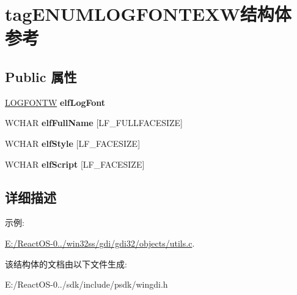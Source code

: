 \hypertarget{structtag_e_n_u_m_l_o_g_f_o_n_t_e_x_w}{}\section{tag\+E\+N\+U\+M\+L\+O\+G\+F\+O\+N\+T\+E\+X\+W结构体 参考}
\label{structtag_e_n_u_m_l_o_g_f_o_n_t_e_x_w}
\subsection*{Public 属性}
\begin{DoxyCompactItemize}
\item 
\mbox{\label{structtag_e_n_u_m_l_o_g_f_o_n_t_e_x_w_a512b9564d48547fbb4aef32613cc3ea9}} 
\hyperlink{struct_l_o_g_f_o_n_t_w}{L\+O\+G\+F\+O\+N\+TW} {\bfseries elf\+Log\+Font}
\item 
\mbox{\label{structtag_e_n_u_m_l_o_g_f_o_n_t_e_x_w_a98de31528bd6132f942af162e5f529be}} 
W\+C\+H\+AR {\bfseries elf\+Full\+Name} \mbox{[}L\+F\+\_\+\+F\+U\+L\+L\+F\+A\+C\+E\+S\+I\+ZE\mbox{]}
\item 
\mbox{\label{structtag_e_n_u_m_l_o_g_f_o_n_t_e_x_w_a2fb5292a1731a4693777148481d3c50e}} 
W\+C\+H\+AR {\bfseries elf\+Style} \mbox{[}L\+F\+\_\+\+F\+A\+C\+E\+S\+I\+ZE\mbox{]}
\item 
\mbox{\label{structtag_e_n_u_m_l_o_g_f_o_n_t_e_x_w_a99d5d4885945451d76de7375677c16f0}} 
W\+C\+H\+AR {\bfseries elf\+Script} \mbox{[}L\+F\+\_\+\+F\+A\+C\+E\+S\+I\+ZE\mbox{]}
\end{DoxyCompactItemize}


\subsection{详细描述}
\begin{Desc}
\item[示例\+: ]\par
\hyperlink{_e_1_2_react_o_s-0_84_86_2win32ss_2gdi_2gdi32_2objects_2utils_8c-example}{E\+:/\+React\+O\+S-\/0../win32ss/gdi/gdi32/objects/utils.\+c}.\end{Desc}


该结构体的文档由以下文件生成\+:\begin{DoxyCompactItemize}
\item 
E\+:/\+React\+O\+S-\/0../sdk/include/psdk/wingdi.\+h\end{DoxyCompactItemize}
